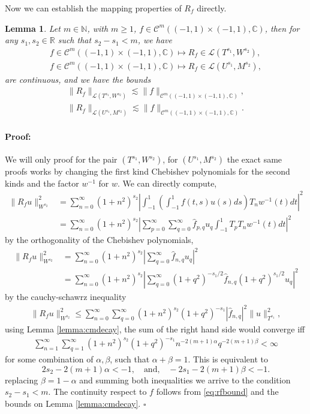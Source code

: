 \documentclass{article}
\newtheorem{lemma}[theorem]{Lemma}
\newenvironment{proof}{\paragraph{Proof:}}{\hfill$\square$}
\newcommand{\IC}{{\mathbb C}}
\newcommand{\IN}{{\mathbb N}}
\newcommand{\IR}{{\mathbb R}}
\newcommand{\cmspace}[3]{\mathcal{C}^{#1} \left( #2, #3 \right)}
\newcommand{\iinterv}{(-1,1)\times(-1,1)}
\begin{document}
Now we can establish the mapping properties of $R_f$ directly. 
\begin{lemma}
\label{lemma:Rfoperator}
Let $m \in \IN$, with $m\geq 1$, $f \in \cmspace{m}{\iinterv}{\IC}$, then for any $s_1,s_2 \in \IR$ such that $s_2 -s_1 < m$, we have 
\begin{align*}
f \in \cmspace{m}{\iinterv}{\IC} \mapsto R_f \in \mathcal{L}(T^{s_1}, W^{s_2}),\\
f \in \cmspace{m}{\iinterv}{\IC} \mapsto R_f \in \mathcal{L}(U^{s_1}, M^{s_2}),
\end{align*}  are continuous, and we have the bounds 
\begin{align*}
\| R_f \|_{\mathcal{L}(T^{s_1}, W^{s_2})} \lesssim \| f\|_{\cmspace{m}{\iinterv}{\IC}},\\
\| R_f \|_{\mathcal{L}(U^{s_1}, M^{s_2})} \lesssim \| f\|_{\cmspace{m}{\iinterv}{\IC}}.
\end{align*}
\end{lemma}
\begin{proof}
We will only proof for the pair $(T^{s_1},W^{s_2})$, for $(U^{s_1},M^{s_2})$ the exact same proofs works by changing the first kind Chebishev polynomials for the second kinds and the factor $w^{-1}$ for $w$. We can directly compute,
\begin{align*}
\|R_fu\|_{W^{s_2}}^2  &= \sum_{n=0}^\infty (1+n^2)^{s_2} \left\vert 
\int_{-1}^1 \left( \int_{-1}^1 f(t,s) u(s) ds\right) T_n w^{-1}(t) dt\right\vert^2\\
& = 
\sum_{n=0}^\infty (1+n^2)^{s_2} \left\vert  \sum_{p=0}^\infty \sum_{q=0}^\infty \widehat{f}_{p,q} u_q
\int_{-1}^1 T_p   T_n w^{-1}(t) dt \right\vert^2
\end{align*} 
by the orthogonality of the Chebishev polynomials,
 \begin{align*}
\|R_fu\|_{W^{s_2}}^2  &=
\sum_{n=0}^\infty (1+n^2)^{s_2} \left\vert   \sum_{q=0}^\infty \widehat{f}_{n,q} u_q
 \right\vert^2 
 \\
 &= 
\sum_{n=0}^\infty (1+n^2)^{s_2} \left\vert   \sum_{q=0}^\infty (1+q^2)^{-s_1/2}\widehat{f}_{n,q} (1 +q^2)^{s_1/2}u_q
 \right\vert^2  
\end{align*} 
by the cauchy-schawrz inequality 
\begin{align}
\label{eq:rfbound}
\|R_fu\|_{W^{s_2}}^2  \leq 
\sum_{n=0}^\infty \sum_{q=0}^\infty (1+n^2)^{s_2}     (1+q^2)^{-s_1}|\widehat{f}_{n,q}|^2  \| u\|^2_{T^{s_1}},
\end{align}
using Lemma \ref{lemma:cmdecay}, the sum of the right hand side would converge iff
\begin{align*}
\sum_{n=1}^\infty \sum_{q=1}^\infty (1+n^2)^{s_2}     (1+q^2)^{-s_1} n^{-2(m+1)\alpha} q^{-2(m+1)\beta} < \infty
\end{align*}
for some combination of $\alpha,\beta$, such that $\alpha + \beta = 1$. This is equivalent to 
$$2s_2 -2(m+1)\alpha < -1, \quad \text{and,} \quad -2s_1 -2(m+1)\beta < -1. $$
replacing $\beta = 1 - \alpha$ and summing both inequalities we arrive to the condition $s_2-s_1 < m$.  The continuity respect to $f$ follows from   \eqref{eq:rfbound} and the bounds on Lemma \ref{lemma:cmdecay}.
\end{proof}
\end{document}
